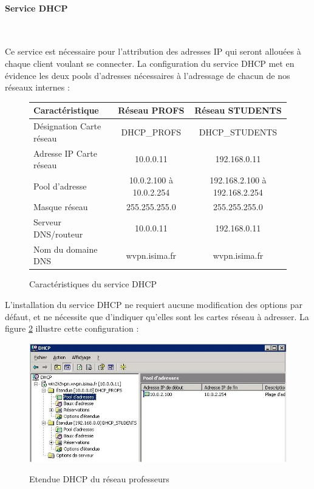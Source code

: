 \paragraph{Service DHCP}
~

Ce service est nécessaire pour l'attribution des adresses IP qui seront allouées à chaque client voulant se connecter. La configuration du service DHCP met en évidence les deux pools d'adresses nécessaires à l'adressage de chacun de nos réseaux internes :

\begin{figure}[H]
	\begin{center}
		\begin{tabular}{l|c|c}
			Caractéristique & Réseau PROFS & Réseau STUDENTS \\
			\hline
			Désignation Carte réseau & DHCP\_PROFS & DHCP\_STUDENTS \\
			Adresse IP Carte réseau & 10.0.0.11 & 192.168.0.11 \\
			Pool d'adresse & 10.0.2.100 à 10.0.2.254 & 192.168.2.100 à 192.168.2.254 \\
			Masque réseau & 255.255.255.0 & 255.255.255.0 \\
			Serveur DNS/routeur & 10.0.0.11 & 192.168.0.11 \\
			Nom du domaine DNS & wvpn.isima.fr & wvpn.isima.fr \\
		\end{tabular}
	\end{center}
	\caption{Caractéristiques du service DHCP}
	\label{service_DHCP}
\end{figure}

L'installation du service DHCP ne requiert aucune modification des options par défaut, et ne nécessite que d'indiquer qu'elles sont les cartes réseau à adresser. La figure \ref{Screen_client_dhcp} illustre cette configuration :

\begin{figure}[H]
	\begin{center}
	\includegraphics[width=\textwidth]{partie_2/screen_windows/dhcp.JPG}\\
	\end{center}
	\caption{Etendue DHCP du réseau professeurs}
	\label{Screen_client_dhcp}
\end{figure}
~

